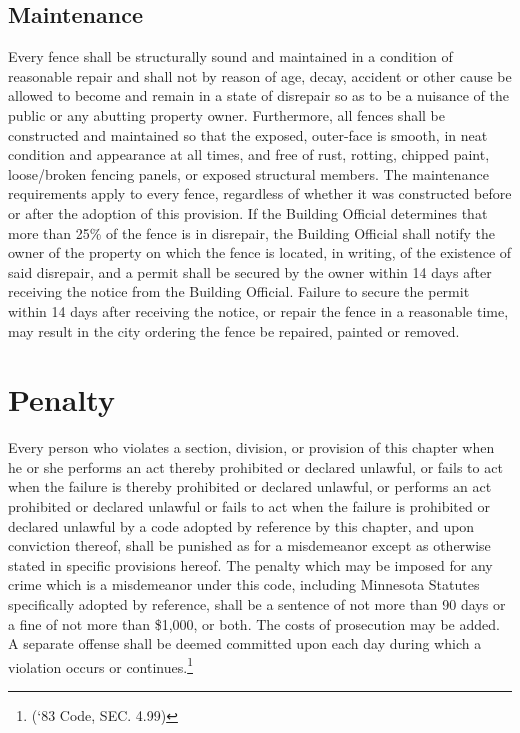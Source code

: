 \subsection{Maintenance}
Every fence shall be structurally sound and maintained in a condition of reasonable repair and shall not by reason of age, decay, accident or other cause be allowed to become and remain in a state of disrepair so as to be a nuisance of the public or any abutting property owner.  Furthermore, all fences shall be constructed and maintained so that the exposed, outer-face is smooth, in neat condition and appearance at all times, and free of rust, rotting, chipped paint, loose/broken fencing panels, or exposed structural members.  The maintenance requirements apply to every fence, regardless of whether it was constructed before or after the adoption of this provision.  If the Building Official determines that more than 25\% of the fence is in disrepair, the Building Official shall notify the owner of the property on which the fence is located, in writing, of the existence of said disrepair, and a permit shall be secured by the owner within 14 days after receiving the notice from the Building Official.  Failure to secure the permit within 14 days after receiving the notice, or repair the fence in a reasonable time, may result in the city ordering the fence be repaired, painted or removed.    

\setcounter{section}{98}
\section{Penalty}
Every person who violates a section, division, or provision of this chapter when he or she performs an act thereby prohibited or declared unlawful, or fails to act when the failure is thereby prohibited or declared unlawful, or performs an act prohibited or declared unlawful or fails to act when the failure is prohibited or declared unlawful by a code adopted by reference by this chapter, and upon conviction thereof, shall be punished as for a misdemeanor except as otherwise stated in specific provisions hereof. The penalty which may be imposed for any crime which is a misdemeanor under this code, including Minnesota Statutes specifically adopted by reference, shall be a sentence of not more than 90 days or a fine of not more than \$1,000, or both. The costs of prosecution may be added. A separate offense shall be deemed committed upon each day during which a violation occurs or continues.\footnote{(‘83 Code, SEC. 4.99)}
